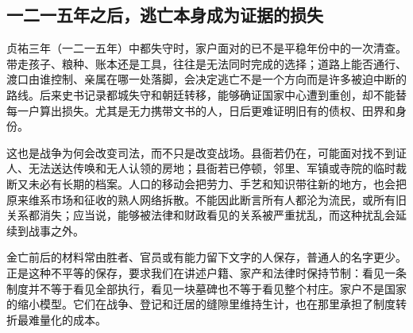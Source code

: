 \subsection{一二一五年之后，逃亡本身成为证据的损失}

贞祐三年（一二一五年）中都失守时，家户面对的已不是平稳年份中的一次清查。带走孩子、粮种、账本还是工具，往往是无法同时完成的选择；道路上能否通行、渡口由谁控制、亲属在哪一处落脚，会决定逃亡不是一个方向而是许多被迫中断的路线。后来史书记录都城失守和朝廷转移，能够确证国家中心遭到重创，却不能替每一户算出损失。尤其是无力携带文书的人，日后更难证明旧有的债权、田界和身份。

这也是战争为何会改变司法，而不只是改变战场。县衙若仍在，可能面对找不到证人、无法送达传唤和无人认领的房地；县衙若已停顿，邻里、军镇或寺院的临时裁断又未必有长期的档案。人口的移动会把劳力、手艺和知识带往新的地方，也会把原来维系市场和征收的熟人网络拆散。不能因此断言所有人都沦为流民，或所有旧关系都消失；应当说，能够被法律和财政看见的关系被严重扰乱，而这种扰乱会延续到战事之外。

金亡前后的材料常由胜者、官员或有能力留下文字的人保存，普通人的名字更少。正是这种不平等的保存，要求我们在讲述户籍、家产和法律时保持节制：看见一条制度并不等于看见全部执行，看见一块墓碑也不等于看见整个村庄。家户不是国家的缩小模型。它们在战争、登记和迁居的缝隙里维持生计，也在那里承担了制度转折最难量化的成本。
